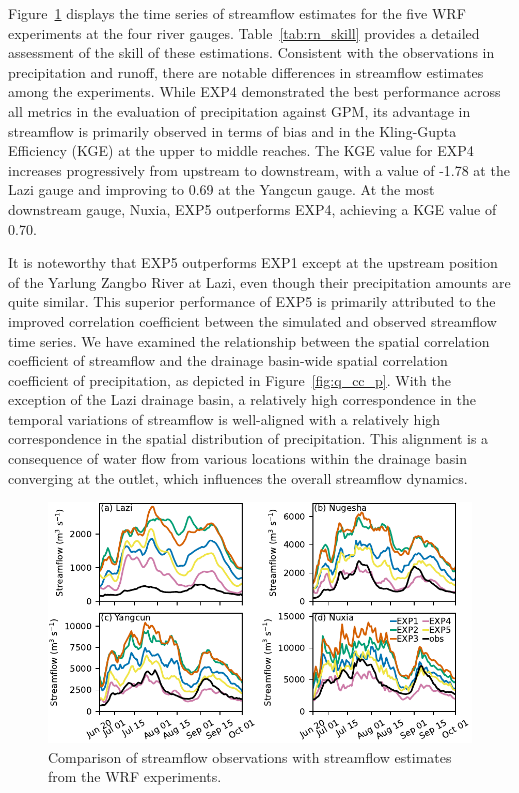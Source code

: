 \documentclass[draft]{agujournal2019}
\begin{document}
Figure~\ref{fig:q_opt} displays the time series of streamflow estimates for the five WRF experiments at the four river gauges. Table~\ref{tab:rn_skill} provides a detailed assessment of the skill of these estimations. Consistent with the observations in precipitation and runoff, there are notable differences in streamflow estimates among the experiments. While EXP4 demonstrated the best performance across all metrics in the evaluation of precipitation against GPM, its advantage in streamflow is primarily observed in terms of bias and in the Kling-Gupta Efficiency (KGE) at the upper to middle reaches. The KGE value for EXP4 increases progressively from upstream to downstream, with a value of -1.78 at the Lazi gauge and improving to 0.69 at the Yangcun gauge. At the most downstream gauge, Nuxia, EXP5 outperforms EXP4, achieving a KGE value of 0.70.

It is noteworthy that EXP5 outperforms EXP1 except at the upstream position of the Yarlung Zangbo River at Lazi, even though their precipitation amounts are quite similar. This superior performance of EXP5 is primarily attributed to the improved correlation coefficient between the simulated and observed streamflow time series. We have examined the relationship between the spatial correlation coefficient of streamflow and the drainage basin-wide spatial correlation coefficient of precipitation, as depicted in Figure~\ref{fig:q_cc_p}. With the exception of the Lazi drainage basin, a relatively high correspondence in the temporal variations of streamflow is well-aligned with a relatively high correspondence in the spatial distribution of precipitation. This alignment is a consequence of water flow from various locations within the drainage basin converging at the outlet, which influences the overall streamflow dynamics.

\begin{figure}[h!]
  \centering
  \noindent\includegraphics[width=140mm]{q_opt.pdf}
  \caption{Comparison of streamflow observations with streamflow estimates from the WRF experiments.}\label{fig:q_opt}
\end{figure}
\end{document}
